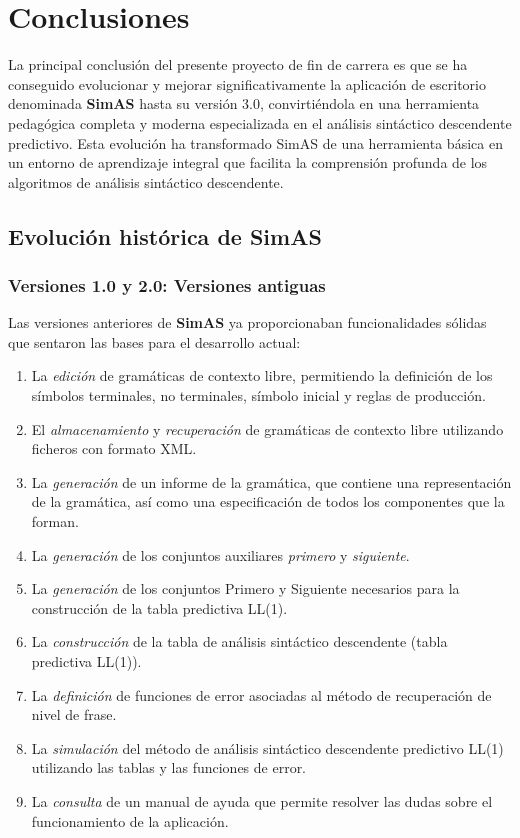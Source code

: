 \chapter{Conclusiones}

La principal conclusión del presente proyecto de fin de carrera es que se ha conseguido evolucionar y mejorar significativamente la aplicación de escritorio denominada \textbf{SimAS} hasta su versión 3.0, convirtiéndola en una herramienta pedagógica completa y moderna especializada en el análisis sintáctico descendente predictivo. Esta evolución ha transformado SimAS de una herramienta básica en un entorno de aprendizaje integral que facilita la comprensión profunda de los algoritmos de análisis sintáctico descendente.

\section{Evolución histórica de SimAS}

\subsection{Versiones 1.0 y 2.0: Versiones antiguas}

Las versiones anteriores de \textbf{SimAS} ya proporcionaban funcionalidades sólidas que sentaron las bases para el desarrollo actual:

\begin{enumerate}
\item La \textit{edición} de gramáticas de contexto libre, permitiendo la definición de los símbolos terminales, no terminales, símbolo inicial y reglas de producción.
\item El \textit{almacenamiento} y \textit{recuperación} de gramáticas de contexto libre utilizando ficheros con formato XML.
\item La \textit{generación} de un informe de la gramática, que contiene una representación de la gramática, así como una especificación de todos los componentes que la forman.
\item La \textit{generación} de los conjuntos auxiliares \textit{primero} y \textit{siguiente}.
\item La \textit{generación} de los conjuntos Primero y Siguiente necesarios para la construcción de la tabla predictiva LL(1).
\item La \textit{construcción} de la tabla de análisis sintáctico descendente (tabla predictiva LL(1)).
\item La \textit{definición} de funciones de error asociadas al método de recuperación de nivel de frase.
\item La \textit{simulación} del método de análisis sintáctico descendente predictivo LL(1) utilizando las tablas y las funciones de error.
\item La \textit{consulta} de un manual de ayuda que permite resolver las dudas sobre el funcionamiento de la aplicación.
\end{enumerate}

